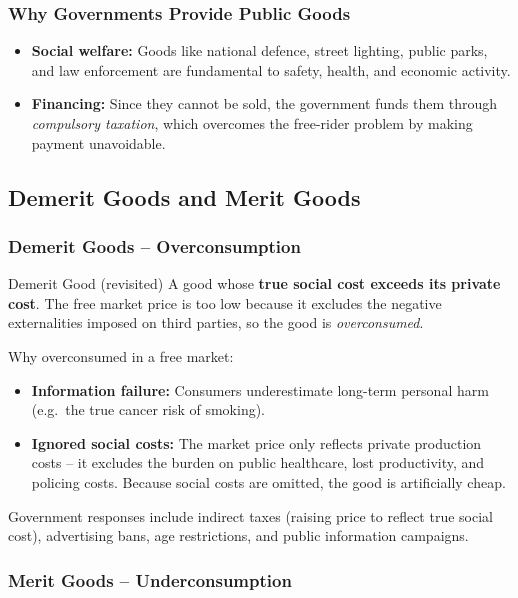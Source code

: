 \documentclass[11pt, a4paper, twoside]{book}
\begin{document}
\subsubsection{Why Governments Provide Public Goods}

\begin{itemize}
  \item \textbf{Social welfare:} Goods like national defence, street lighting, public parks, and law enforcement are fundamental to safety, health, and economic activity.
  \item \textbf{Financing:} Since they cannot be sold, the government funds them through \emph{compulsory taxation}, which overcomes the free-rider problem by making payment unavoidable.
\end{itemize}

\subsection{Demerit Goods and Merit Goods}

\subsubsection{Demerit Goods -- Overconsumption}

\begin{keyterm}{Demerit Good (revisited)}
A good whose \textbf{true social cost exceeds its private cost}. The free market price is too low because it excludes the negative externalities imposed on third parties, so the good is \emph{overconsumed}.
\end{keyterm}

Why overconsumed in a free market:
\begin{itemize}
  \item \textbf{Information failure:} Consumers underestimate long-term personal harm (e.g.\ the true cancer risk of smoking).
  \item \textbf{Ignored social costs:} The market price only reflects private production costs -- it excludes the burden on public healthcare, lost productivity, and policing costs. Because social costs are omitted, the good is artificially cheap.
\end{itemize}

Government responses include indirect taxes (raising price to reflect true social cost), advertising bans, age restrictions, and public information campaigns.

\subsubsection{Merit Goods -- Underconsumption}
\end{document}
